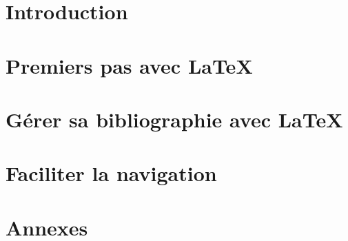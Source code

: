 \part{Introduction}




\part{Premiers pas avec \LaTeX}








\part{Gérer sa bibliographie avec \LaTeX}








\part{Faciliter la navigation}




\part{Annexes}

